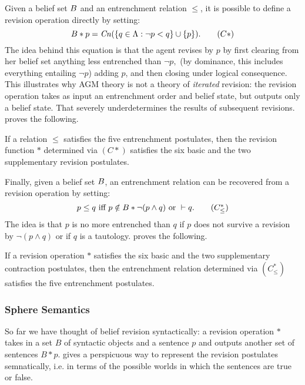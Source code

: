 Given a belief set $B$ and an entrenchment relation $\leq$, it is possible
to define a revision operation directly by setting:
\begin{equation*}
B*p = \text{\textit{Cn}}( \{ q \in \Lambda : \neg p < q \} \cup \{p\}). \tag{$C*$}
\end{equation*}
The idea behind this equation is that the agent revises by $p$ by first clearing
from her belief set anything less entrenched than $\neg p,$ (by dominance, this
includes everything entailing $\neg p$) adding $p$, and then closing under
logical consequence.  This illustrates why AGM theory is not a theory of {\em
iterated} revision: the revision operation takes as input an entrenchment order
and belief state, but outputs only a belief state. That severely underdetermines
the results of subsequent revisions. \citet{gardenfors1988knowledge} proves the
following.
\begin{theorem}
If a relation $\leq$ satisfies the five entrenchment postulates, then the
revision function $*$ determined via $(C*)$ satisfies the six basic and the two
supplementary revision postulates.
\end{theorem}
Finally, given a belief set $B$, an entrenchment relation can be recovered
from a revision operation by setting:
\begin{equation*}
p\leq q \text{ iff } p\notin B*\neg(p\wedge q) \text{ or } \vdash q. \tag{$C^*_\leq$}
\end{equation*}
The idea is that $p$ is no more entrenched than $q$ if $p$ does not survive a
revision by $\neg(p \wedge q)$ or if $q$ is a tautology.  \citet{rott2003basic}
proves the following.
\begin{theorem}
If a revision operation $*$ satisfies the six basic and the two supplementary
contraction postulates, then the entrenchment relation determined via
$(C^*_\leq)$ satisfies the five entrenchment postulates. 
\end{theorem}


\subsubsection{Sphere Semantics}\label{grove}

So far we have thought of belief revision syntactically: a revision operation
$*$ takes in a set $B$ of syntactic objects and a sentence $p$ and outputs
another set of sentences $B*p.$ \citet{grove1988two} gives a perspicuous way to
represent the revision postulates semnatically, i.e. in terms of the possible
worlds in which the sentences are true or false.

